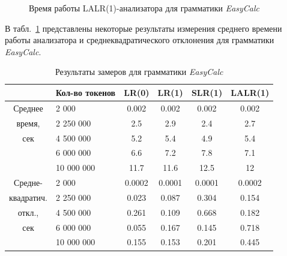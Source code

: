 \documentclass[14pt]{matmex-diploma}
\begin{document}
\begin{figure}[H]
  \caption{Время работы LALR(1)-анализатора для грамматики \textit{EasyCalc}}
  \label{EasyCalcLALR1}
  \centering
\end{figure}

\newpage

В табл.~\ref{tab:EasyCalc} представлены некоторые результаты измерения среднего времени работы анализатора и среднеквадратического отклонения для грамматики \textit{EasyCalc}.

\begin{table}[h]
\begin{center}
\begin{tabular}{|c|l|c|c|c|c|}
\hline  
 & Кол-во токенов & LR(0) & LR(1) & SLR(1) & LALR(1) \\ 
\hline  
 Среднее & 2 000 &  0.002 & 0.002 & 0.002 & 0.002 \\  
\cline{2-6}
время, & 2 250 000 & 2.5 & 2.9 & 2.4 & 2.7 \\  
\cline{2-6}
сек & 4 500 000 & 5.2 & 5.4 & 4.9 & 5.4 \\
\cline{2-6}
 & 6 000 000 & 6.6 & 7.2 & 7.8 & 7.1 \\
\cline{2-6}
 & 10 000 000 & 11.7 & 11.6 & 12.5 & 12 \\
\hline
\hline
Средне- & 2 000 & 0.0002 & 0.0001 & 0.0001 & 0.0002 \\  
\cline{2-6}
квадратич. & 2 250 000 & 0.023 & 0.087 & 0.304 & 0.154 \\  
\cline{2-6}
откл., & 4 500 000 & 0.261 & 0.109 & 0.668 & 0.182 \\
\cline{2-6}
сек & 6 000 000 & 0.055 & 0.167 & 0.145 & 0.718 \\
\cline{2-6}
 & 10 000 000 & 0.155 & 0.153 & 0.201 & 0.445 \\               
\hline  
\end{tabular}
\end{center}
\caption{\label{tab:EasyCalc} Результаты замеров для грамматики \textit{EasyCalc}}
\end{table}
\end{document}
